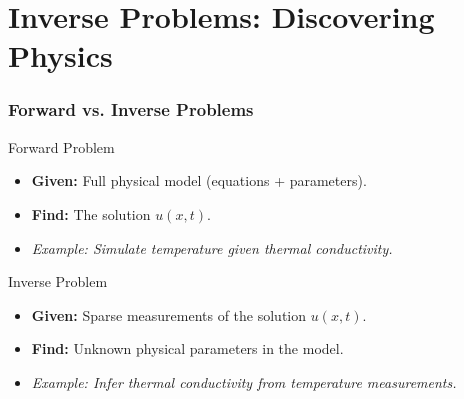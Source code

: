 \documentclass[notes]{beamer}
\begin{document}
\section{Inverse Problems: Discovering Physics}

\begin{frame}
\frametitle{Forward vs. Inverse Problems}

\begin{block}{Forward Problem}
\begin{itemize}
    \item \textbf{Given:} Full physical model (equations + parameters).
    \item \textbf{Find:} The solution $u(x,t)$.
    \item \textit{Example: Simulate temperature given thermal conductivity.}
\end{itemize}
\end{block}

\begin{block}{Inverse Problem}
\begin{itemize}
    \item \textbf{Given:} Sparse measurements of the solution $u(x,t)$.
    \item \textbf{Find:} Unknown physical parameters in the model.
    \item \textit{Example: Infer thermal conductivity from temperature measurements.}
\end{itemize}
\end{block}

\vspace{1em}
\centering
\href{https://colab.research.google.com/github/kks32-courses/ut-portugal-sciml/blob/main/docs/01-pinn/inverse-heat.ipynb}{}


\end{frame}
\end{document}
